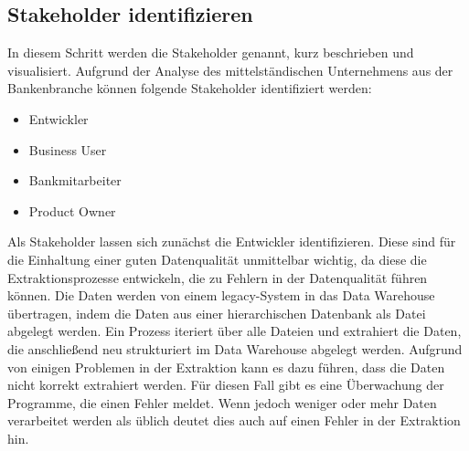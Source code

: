 
\subsection{Stakeholder identifizieren}
In diesem Schritt werden die Stakeholder genannt, kurz beschrieben und visualisiert. 
Aufgrund der Analyse des mittelständischen Unternehmens aus der Bankenbranche können folgende Stakeholder identifiziert werden:
\begin{itemize}
\item Entwickler            %
\item Business User         %
\item Bankmitarbeiter       %
\item Product Owner         %
\end{itemize}

Als Stakeholder lassen sich zunächst die Entwickler identifizieren.
Diese sind für die Einhaltung einer guten Datenqualität unmittelbar wichtig, da diese die Extraktionsprozesse entwickeln, die zu Fehlern in der Datenqualität führen können.
Die Daten werden von einem legacy-System in das Data Warehouse übertragen, indem die Daten aus einer hierarchischen Datenbank als Datei abgelegt werden.
Ein Prozess iteriert über alle Dateien und extrahiert die Daten, die anschließend neu strukturiert im Data Warehouse abgelegt werden.
Aufgrund von einigen Problemen in der Extraktion kann es dazu führen, dass die Daten nicht korrekt extrahiert werden.
Für diesen Fall gibt es eine Überwachung der Programme, die einen Fehler meldet.
Wenn jedoch weniger oder mehr Daten verarbeitet werden als üblich deutet dies auch auf einen Fehler in der Extraktion hin. 

